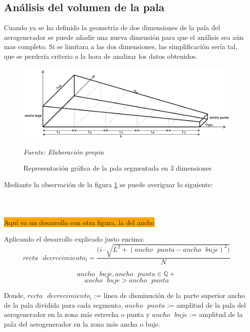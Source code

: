 \subsection{Análisis del volumen de la pala}
\label{section:volumen_pala}

Cuando ya se ha definido la geometría de dos dimensiones de la pala del aerogenerador se puede añadir una nueva dimensión para que el análisis sea aún mas completo. Si se limitara a las dos dimensiones, las simplificación sería tal, que se perdería criterio a la hora de analizar los datos obtenidos.


    \begin{figure}[H]
    \centering
    \includegraphics[width=1\textwidth]{images/pala 3d segmentada enorme.png}
    \caption{Representación gráfica de la pala segmentada en 3 dimensiones}
    \label{fig:analisis_volumen}
    \textit{Fuente: Elaboración propia}
\end{figure}



Mediante la observación de la figura \ref{fig:analisis_volumen} se puede averiguar lo siguiente: \\\\\\\\

\colorbox{Orange}{ \Huge Aquí va un desarrollo con otra figura, la del ancho}

\begin{definicion}
Aplicando el desarrollo explicado justo encima:
$$ recta \text{ } decrecimiento_i = \dfrac{( i \cdot \sqrt{L^2 + (ancho \text{ } punta - ancho \text{ } buje)^2)}}{N}$$
 
$$ancho \text{ } buje, ancho  \text{ } punta \in \mathbb{Q+}$$
$$ ancho \text{ } buje > ancho \text{ } punta $$

Donde,
\centering $recta \text{ } decrecimiento_i $ := línea de disminución de la parte superior ancho de la pala dividida para cada segmento,  $ancho \text{ } punta$ := amplitud de la pala del aerogenerador en la zona más estrecha o punta y $ancho \text{ } buje$ := amplitud de la pala del aerogenerador en la zona más ancha o buje.
\label{def:ancho_buje_punta}
\end{definicion}


